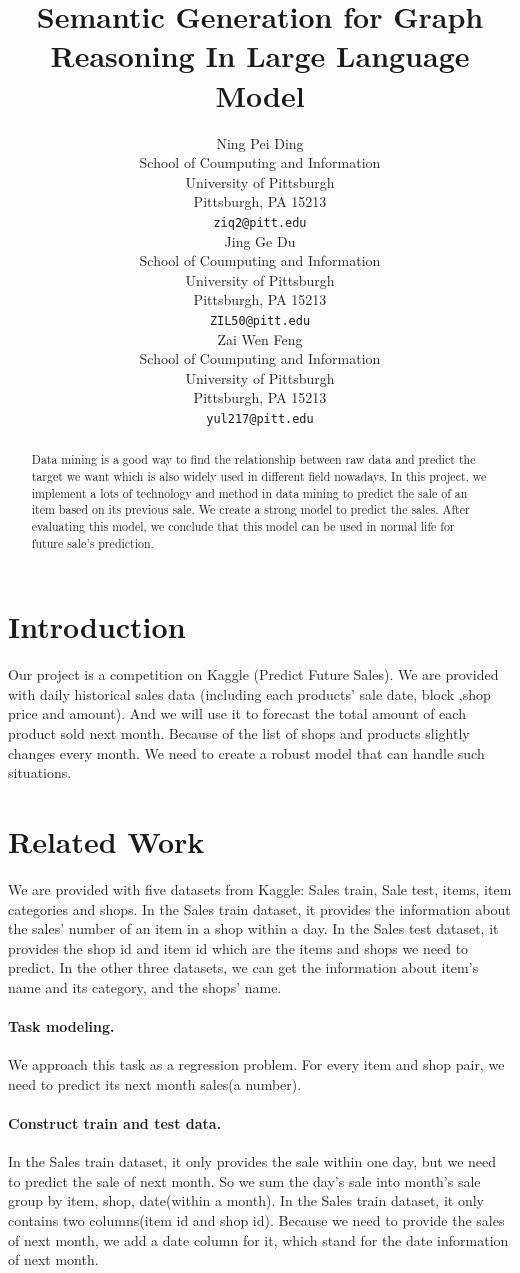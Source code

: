 \documentclass{article}
\title{Semantic Generation for Graph Reasoning In Large Language Model}
\author{
 Ning Pei Ding \\
  School of Coumputing and Information\\
  University of Pittsburgh\\
  Pittsburgh, PA 15213 \\
  \texttt{ziq2@pitt.edu} \\
   \And
 Jing Ge Du \\
  School of Coumputing and Information\\
  University of Pittsburgh\\
  Pittsburgh, PA 15213 \\
  \texttt{ZIL50@pitt.edu} \\
  \And
 Zai Wen Feng \\
  School of Coumputing and Information\\
  University of Pittsburgh\\
  Pittsburgh, PA 15213 \\
  \texttt{yul217@pitt.edu} \\
}
\begin{document}
\maketitle
\begin{abstract}
Data mining is a good way to find the relationship between raw data and predict the target we want which is also widely used in different field nowadays. In this project, we implement a lots of technology and method in data mining to predict the sale of an item based on its previous sale. We create a strong model to predict the sales. After evaluating this model, we conclude that this model can be used in normal life for future sale’s prediction. 
\end{abstract}




\section{Introduction}
Our project is a competition on Kaggle (Predict Future Sales). We are provided with daily historical sales data (including each products’ sale date, block ,shop price and amount). And we will use it to forecast the total amount of each product sold next month. Because of the list of shops and products slightly changes every month. We need to create a robust model that can handle such situations.


\section{Related Work}
\label{sec:headings}
We are provided with five datasets from Kaggle: Sales train, Sale test, items, item categories and shops. In the Sales train dataset, it provides the information about the sales’ number of an item in a shop within a day. In the Sales test dataset, it provides the shop id and item id which are the items and shops we need to predict. In the other three datasets, we can get the information about item’s name and its category, and the shops’ name.
\paragraph{Task modeling.}
We approach this task as a regression problem. For every item and shop pair, we need to predict its next month sales(a number).
\paragraph{Construct train and test data.}
In the Sales train dataset, it only provides the sale within one day, but we need to predict the sale of next month. So we sum the day's sale into month's sale group by item, shop, date(within a month).
In the Sales train dataset, it only contains two columns(item id and shop id). Because we need to provide the sales of next month, we add a date column for it, which stand for the date information of next month.
\end{document}
